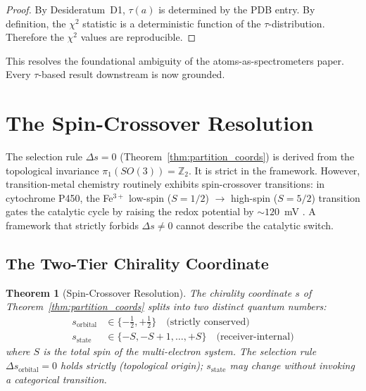 \documentclass[11pt,twocolumn,a4paper]{article}
\newtheorem{theorem}{Theorem}[section]
\theoremstyle{definition}
\theoremstyle{remark}
\newcommand{\Z}{\mathbb{Z}}
\begin{document}
\begin{proof}
By Desideratum~D1, $\tau(a)$ is determined by the PDB entry. By definition, the $\chi^2$ statistic is a deterministic function of the $\tau$-distribution. Therefore the $\chi^2$ values are reproducible.
\end{proof}

This resolves the foundational ambiguity of the atoms-as-spectrometers paper. Every $\tau$-based result downstream is now grounded.

\section{The Spin-Crossover Resolution}
\label{sec:spin}

The selection rule $\Delta s = 0$ (Theorem~\ref{thm:partition_coords}) is derived from the topological invariance $\pi_1(SO(3)) = \Z_2$. It is strict in the framework. However, transition-metal chemistry routinely exhibits spin-crossover transitions: in cytochrome P450, the Fe$^{3+}$ low-spin ($S = 1/2$) $\to$ high-spin ($S = 5/2$) transition gates the catalytic cycle by raising the redox potential by $\sim 120$~mV \citep{poulos2003}. A framework that strictly forbids $\Delta s \neq 0$ cannot describe the catalytic switch.

\subsection{The Two-Tier Chirality Coordinate}

\begin{theorem}[Spin-Crossover Resolution]
\label{thm:spin_resolution}
The chirality coordinate $s$ of Theorem~\ref{thm:partition_coords} splits into two distinct quantum numbers:
\begin{align}
s_{\mathrm{orbital}} &\in \{-\tfrac{1}{2}, +\tfrac{1}{2}\} \quad \text{(strictly conserved)} \\
s_{\mathrm{state}} &\in \{-S, -S+1, \ldots, +S\} \quad \text{(receiver-internal)}
\end{align}
where $S$ is the total spin of the multi-electron system. The selection rule $\Delta s_{\mathrm{orbital}} = 0$ holds strictly (topological origin); $s_{\mathrm{state}}$ may change without invoking a categorical transition.
\end{theorem}
\end{document}
